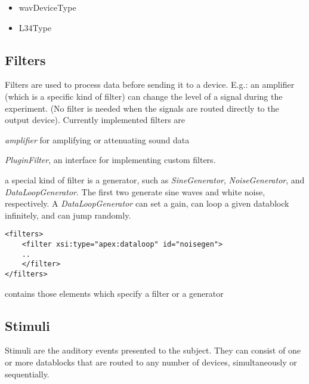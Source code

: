 \begin{itemize}

\item wavDeviceType

\item L34Type
\end{itemize}

\subsection{Filters}
\label{sec:Filters}


Filters are used to process data before sending it to a device.
E.g.: an amplifier (which is a specific kind of filter) can change
the level of a signal during the experiment. (No filter is needed
when the signals are routed directly to the output device).
Currently implemented filters are

\begin{description}
\item \emph {amplifier} for amplifying or attenuating sound data

\item \emph {PluginFilter}, an interface for implementing custom
filters.

\item a special kind of filter is a generator, such as \emph
{SineGenerator}, \emph {NoiseGenerator}, and \emph
{DataLoopGenerator}. The first two generate sine waves and white
noise, respectively. A \emph{DataLoopGenerator} can set a gain,
can loop a given datablock infinitely, and can jump randomly.
\end {description}

\begin{lstlisting}
<filters>
    <filter xsi:type="apex:dataloop" id="noisegen">
    ..
    </filter>
</filters>
\end{lstlisting}

 contains those elements which specify a filter or
a generator


\subsection{Stimuli}
\label{sec:Stimuli}

 Stimuli are the auditory events presented to the
subject. They can consist of one or more datablocks that are
routed to any number of devices, simultaneously or sequentially.

